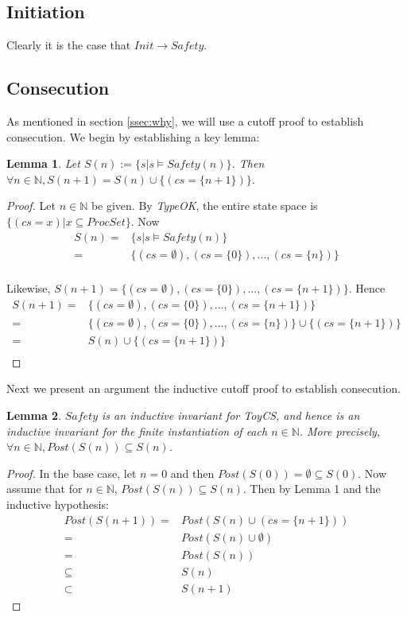\documentclass[12pt]{article}
\newtheorem{lemma}{Lemma}
\begin{document}
\subsection{Initiation}
Clearly it is the case that $Init \rightarrow Safety$.

\subsection{Consecution}
As mentioned in section \ref{ssec:why}, we will use a cutoff proof to establish consecution.  We begin by establishing a key lemma:

\begin{lemma}
  Let $S(n) := \{s | s \models Safety(n)\}$.  Then $\forall n \in \mathbb{N}, S(n+1) = S(n) \cup \{(cs = \{n+1\})\}$.
\end{lemma}
\begin{proof}
  Let $n \in \mathbb{N}$ be given.  By \textit{TypeOK}, the entire state space is $\{(cs = x) | x \subseteq ProcSet\}$.  Now
  \begin{align*}
    S(n) = &\{s | s \models Safety(n)\}\\
    = &\{(cs = \emptyset), (cs = \{0\}), ..., (cs = \{n\})\}\\
  \end{align*}

  Likewise, $S(n+1) = \{(cs = \emptyset), (cs = \{0\}), ..., (cs = \{n+1\})\}$.  Hence
  \begin{align*}
    S(n+1) = &\{(cs = \emptyset), (cs = \{0\}), ..., (cs = \{n+1\})\}\\
    = &\{(cs = \emptyset), (cs = \{0\}), ..., (cs = \{n\})\} \cup \{(cs = \{n+1\})\}\\
    = &S(n) \cup \{(cs = \{n+1\})\}\\
  \end{align*}
\end{proof}

Next we present an argument the inductive cutoff proof to establish consecution.

\begin{lemma}
  $Safety$ is an inductive invariant for ToyCS, and hence is an inductive invariant for the finite instantiation of each $n \in \mathbb{N}$.  More precisely, $\forall n \in \mathbb{N}, Post(S(n)) \subseteq S(n)$.
\end{lemma}
\begin{proof}
  In the base case, let $n=0$ and then $Post(S(0)) = \emptyset \subseteq S(0)$.  Now assume that for $n \in \mathbb{N}$, $Post(S(n)) \subseteq S(n)$.  Then by Lemma 1 and the inductive hypothesis:
  \begin{align*}
    Post(S(n+1)) = &Post(S(n) \cup (cs = \{n+1\}))\\
    = &Post(S(n) \cup \emptyset)\\
    = &Post(S(n))\\
    \subseteq &S(n)\\
    \subset &S(n+1)
  \end{align*}
\end{proof}
\end{document}
